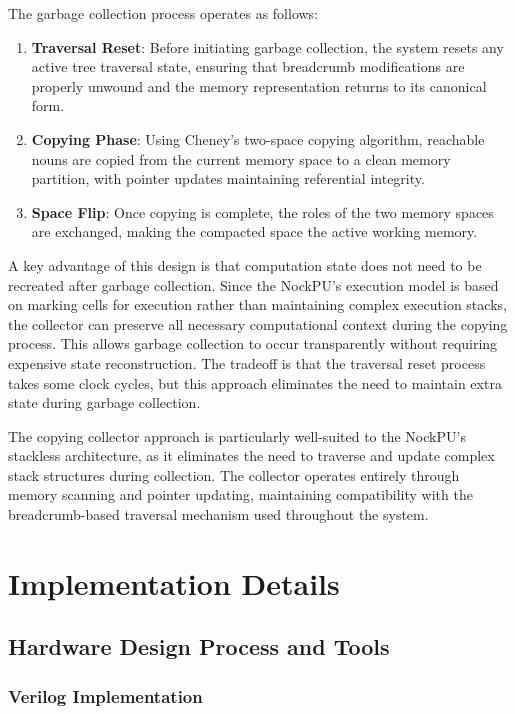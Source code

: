 \documentclass[twoside]{article}
\begin{document}
The garbage collection process operates as follows:

\begin{enumerate}
  \item \textbf{Traversal Reset}: Before initiating garbage collection, the system resets any active tree traversal state, ensuring that breadcrumb modifications are properly unwound and the memory representation returns to its canonical form.
  \item \textbf{Copying Phase}: Using Cheney's two-space copying algorithm, reachable nouns are copied from the current memory space to a clean memory partition, with pointer updates maintaining referential integrity.
  \item \textbf{Space Flip}: Once copying is complete, the roles of the two memory spaces are exchanged, making the compacted space the active working memory.
\end{enumerate}

\noindent
A key advantage of this design is that computation state does not need to be recreated after garbage collection. Since the NockPU's execution model is based on marking cells for execution rather than maintaining complex execution stacks, the collector can preserve all necessary computational context during the copying process. This allows garbage collection to occur transparently without requiring expensive state reconstruction. The tradeoff is that the traversal reset process takes some clock cycles, but this approach eliminates the need to maintain extra state during garbage collection.

The copying collector approach is particularly well-suited to the NockPU's stackless architecture, as it eliminates the need to traverse and update complex stack structures during collection. The collector operates entirely through memory scanning and pointer updating, maintaining compatibility with the breadcrumb-based traversal mechanism used throughout the system.

\section{Implementation Details}

\subsection{Hardware Design Process and Tools}

\subsubsection{Verilog Implementation}
\end{document}

